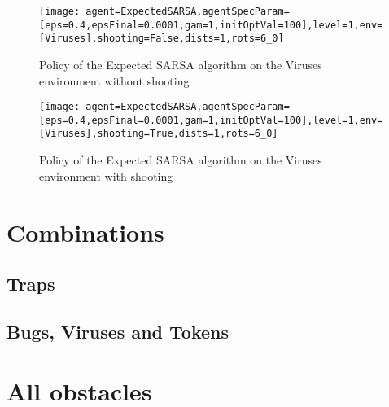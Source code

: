 \begin{figure}[h]
    \centering
    \texttt{[image: agent=ExpectedSARSA,agentSpecParam=[eps=0.4,epsFinal=0.0001,gam=1,initOptVal=100],level=1,env=[Viruses],shooting=False,dists=1,rots=6\_0]}
    \caption{Policy of the Expected SARSA algorithm on the Viruses environment without shooting}
    \label{fig:esvir}
\end{figure}


\begin{figure}[h]
    \centering
    \texttt{[image: agent=ExpectedSARSA,agentSpecParam=[eps=0.4,epsFinal=0.0001,gam=1,initOptVal=100],level=1,env=[Viruses],shooting=True,dists=1,rots=6\_0]}
    \caption{Policy of the Expected SARSA algorithm on the Viruses environment with shooting}
    \label{fig:esvirShooting}
\end{figure}

\section{Combinations}
\subsection{Traps}
\subsection{Bugs, Viruses and Tokens}

\section{All obstacles}

